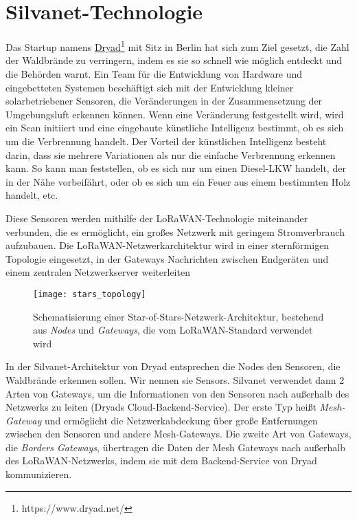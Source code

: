 \section{Silvanet-Technologie}

Das Startup namens \href{https://www.dryad.net/}{Dryad}\footnote{https://www.dryad.net/} mit Sitz in Berlin hat sich zum Ziel gesetzt, die Zahl der Waldbrände zu verringern, indem es sie so schnell wie möglich entdeckt und die Behörden warnt.
Ein Team für die Entwicklung von Hardware und eingebetteten Systemen beschäftigt sich mit der Entwicklung kleiner solarbetriebener Sensoren, die Veränderungen in der Zusammensetzung der Umgebungsluft erkennen können.
Wenn eine Veränderung festgestellt wird, wird ein Scan initiiert und eine eingebaute künstliche Intelligenz bestimmt, ob es sich um die Verbrennung handelt.
Der Vorteil der künstlichen Intelligenz besteht darin, dass sie mehrere Variationen als nur die einfache Verbrennung erkennen kann. So kann man feststellen, ob es sich nur um einen Diesel-LKW handelt, der in der Nähe vorbeifährt, oder ob es sich um ein Feuer aus einem bestimmten Holz handelt, etc.

Diese Sensoren werden mithilfe der LoRaWAN-Technologie miteinander verbunden, die es ermöglicht, ein großes Netzwerk mit geringem Stromverbrauch aufzubauen.
Die LoRaWAN-Netzwerkarchitektur wird in einer sternförmigen Topologie eingesetzt, in der Gateways Nachrichten zwischen Endgeräten und einem zentralen Netzwerkserver weiterleiten

\begin{figure}[h]
  \centering
  \texttt{[image: stars\_topology]}
  \caption{Schematisierung einer Star-of-Stars-Netzwerk-Architektur, bestehend aus \textit{Nodes} und \textit{Gateways}, die vom LoRaWAN-Standard verwendet wird\cite{phdthesisLoRA}}
\end{figure}

In der Silvanet-Architektur von Dryad entsprechen die Nodes den Sensoren, die Waldbrände erkennen sollen. Wir nennen sie Sensors.
Silvanet verwendet dann 2 Arten von Gateways, um die Informationen von den Sensoren nach außerhalb des Netzwerks zu leiten (Dryads Cloud-Backend-Service).
Der erste Typ heißt \textit{Mesh-Gateway} und ermöglicht die Netzwerkabdeckung über große Entfernungen zwischen den Sensoren und andere Mesh-Gateways.
Die zweite Art von Gateways, die \textit{Borders Gateways}, übertragen die Daten der Mesh Gateways nach außerhalb des LoRaWAN-Netzwerks, indem sie mit dem Backend-Service von Dryad kommunizieren.

